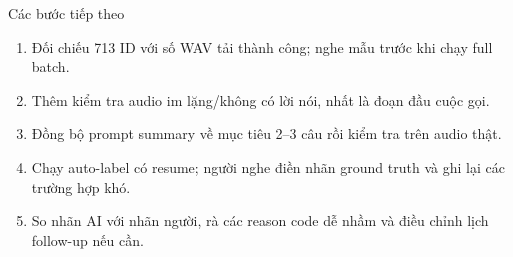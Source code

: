 \documentclass{beamer}
\begin{document}
\begin{frame}{Các bước tiếp theo}
\begin{enumerate}
    \item Đối chiếu 713 ID với số WAV tải thành công; nghe mẫu trước khi chạy full batch.
    \item Thêm kiểm tra audio im lặng/không có lời nói, nhất là đoạn đầu cuộc gọi.
    \item Đồng bộ prompt summary về mục tiêu 2--3 câu rồi kiểm tra trên audio thật.
    \item Chạy auto-label có resume; người nghe điền nhãn ground truth và ghi lại các trường hợp khó.
    \item So nhãn AI với nhãn người, rà các reason code dễ nhầm và điều chỉnh lịch follow-up nếu cần.
\end{enumerate}
\end{frame}
\end{document}
